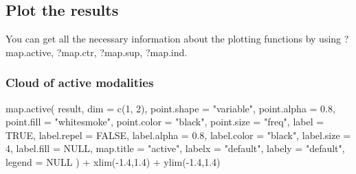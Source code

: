 \documentclass[
  letterpaper,
  DIV=11,
  numbers=noendperiod]{scrartcl}
\newenvironment{Shaded}{\begin{snugshade}}{\end{snugshade}}
\newcommand{\AttributeTok}[1]{\textcolor[rgb]{0.40,0.45,0.13}{#1}}
\newcommand{\ConstantTok}[1]{\textcolor[rgb]{0.56,0.35,0.01}{#1}}
\newcommand{\DecValTok}[1]{\textcolor[rgb]{0.68,0.00,0.00}{#1}}
\newcommand{\FloatTok}[1]{\textcolor[rgb]{0.68,0.00,0.00}{#1}}
\newcommand{\FunctionTok}[1]{\textcolor[rgb]{0.28,0.35,0.67}{#1}}
\newcommand{\NormalTok}[1]{\textcolor[rgb]{0.00,0.23,0.31}{#1}}
\newcommand{\SpecialCharTok}[1]{\textcolor[rgb]{0.37,0.37,0.37}{#1}}
\newcommand{\StringTok}[1]{\textcolor[rgb]{0.13,0.47,0.30}{#1}}
\begin{document}
\normalsize

\subsection{Plot the results}\label{plot-the-results}

You can get all the necessary information about the plotting functions
by using ?map.active, ?map.ctr, ?map.sup, ?map.ind.

\subsubsection{Cloud of active
modalities}\label{cloud-of-active-modalities}

\scriptsize

\begin{Shaded}
\begin{Highlighting}[]
\FunctionTok{map.active}\NormalTok{(}
\NormalTok{  result,}
  \AttributeTok{dim =} \FunctionTok{c}\NormalTok{(}\DecValTok{1}\NormalTok{, }\DecValTok{2}\NormalTok{),}
  \AttributeTok{point.shape =} \StringTok{"variable"}\NormalTok{,}
  \AttributeTok{point.alpha =} \FloatTok{0.8}\NormalTok{,}
  \AttributeTok{point.fill =} \StringTok{"whitesmoke"}\NormalTok{,}
  \AttributeTok{point.color =} \StringTok{"black"}\NormalTok{,}
  \AttributeTok{point.size =} \StringTok{"freq"}\NormalTok{,}
  \AttributeTok{label =} \ConstantTok{TRUE}\NormalTok{,}
  \AttributeTok{label.repel =} \ConstantTok{FALSE}\NormalTok{,}
  \AttributeTok{label.alpha =} \FloatTok{0.8}\NormalTok{,}
  \AttributeTok{label.color =} \StringTok{"black"}\NormalTok{,}
  \AttributeTok{label.size =} \DecValTok{4}\NormalTok{,}
  \AttributeTok{label.fill =} \ConstantTok{NULL}\NormalTok{,}
  \AttributeTok{map.title =} \StringTok{"active"}\NormalTok{,}
  \AttributeTok{labelx =} \StringTok{"default"}\NormalTok{,}
  \AttributeTok{labely =} \StringTok{"default"}\NormalTok{,}
  \AttributeTok{legend =} \ConstantTok{NULL}
\NormalTok{) }\SpecialCharTok{+} \FunctionTok{xlim}\NormalTok{(}\SpecialCharTok{{-}}\FloatTok{1.4}\NormalTok{,}\FloatTok{1.4}\NormalTok{) }\SpecialCharTok{+} \FunctionTok{ylim}\NormalTok{(}\SpecialCharTok{{-}}\FloatTok{1.4}\NormalTok{,}\FloatTok{1.4}\NormalTok{)}
\end{Highlighting}
\end{Shaded}
\end{document}
